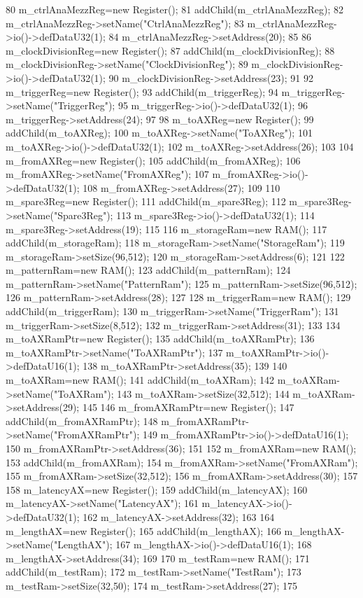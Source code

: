 \begin{DoxyCode}
{80     m_ctrlAnaMezzReg=new Register();
81     addChild(m_ctrlAnaMezzReg);
82     m_ctrlAnaMezzReg->setName("CtrlAnaMezzReg");
83     m_ctrlAnaMezzReg->io()->defDataU32(1);
84     m_ctrlAnaMezzReg->setAddress(20);
85 
86     m_clockDivisionReg=new Register();
87     addChild(m_clockDivisionReg);
88     m_clockDivisionReg->setName("ClockDivisionReg");
89     m_clockDivisionReg->io()->defDataU32(1);
90     m_clockDivisionReg->setAddress(23);
91 
92     m_triggerReg=new Register();
93     addChild(m_triggerReg);
94     m_triggerReg->setName("TriggerReg");
95     m_triggerReg->io()->defDataU32(1);
96     m_triggerReg->setAddress(24);
97 
98     m_toAXReg=new Register();
99     addChild(m_toAXReg);
100     m_toAXReg->setName("ToAXReg");
101     m_toAXReg->io()->defDataU32(1);
102     m_toAXReg->setAddress(26);
103 
104     m_fromAXReg=new Register();
105     addChild(m_fromAXReg);
106     m_fromAXReg->setName("FromAXReg");
107     m_fromAXReg->io()->defDataU32(1);
108     m_fromAXReg->setAddress(27);
109 
110     m_spare3Reg=new Register();
111     addChild(m_spare3Reg);
112     m_spare3Reg->setName("Spare3Reg");
113     m_spare3Reg->io()->defDataU32(1);
114     m_spare3Reg->setAddress(19);
115 
116     m_storageRam=new RAM();
117     addChild(m_storageRam);
118     m_storageRam->setName("StorageRam");
119     m_storageRam->setSize(96,512);
120     m_storageRam->setAddress(6);
121 
122     m_patternRam=new RAM();
123     addChild(m_patternRam);
124     m_patternRam->setName("PatternRam");
125     m_patternRam->setSize(96,512);
126     m_patternRam->setAddress(28);
127 
128     m_triggerRam=new RAM();
129     addChild(m_triggerRam);
130     m_triggerRam->setName("TriggerRam");
131     m_triggerRam->setSize(8,512);
132     m_triggerRam->setAddress(31);
133 
134     m_toAXRamPtr=new Register();
135     addChild(m_toAXRamPtr);
136     m_toAXRamPtr->setName("ToAXRamPtr");
137     m_toAXRamPtr->io()->defDataU16(1);
138     m_toAXRamPtr->setAddress(35);
139 
140     m_toAXRam=new RAM();
141     addChild(m_toAXRam);
142     m_toAXRam->setName("ToAXRam");
143     m_toAXRam->setSize(32,512);
144     m_toAXRam->setAddress(29);
145 
146     m_fromAXRamPtr=new Register();
147     addChild(m_fromAXRamPtr);
148     m_fromAXRamPtr->setName("FromAXRamPtr");
149     m_fromAXRamPtr->io()->defDataU16(1);
150     m_fromAXRamPtr->setAddress(36);
151 
152     m_fromAXRam=new RAM();
153     addChild(m_fromAXRam);
154     m_fromAXRam->setName("FromAXRam");
155     m_fromAXRam->setSize(32,512);
156     m_fromAXRam->setAddress(30);
157 
158     m_latencyAX=new Register();
159     addChild(m_latencyAX);
160     m_latencyAX->setName("LatencyAX");
161     m_latencyAX->io()->defDataU32(1);
162     m_latencyAX->setAddress(32);
163 
164     m_lengthAX=new Register();
165     addChild(m_lengthAX);
166     m_lengthAX->setName("LengthAX");
167     m_lengthAX->io()->defDataU16(1);
168     m_lengthAX->setAddress(34);
169 
170     m_testRam=new RAM();
171     addChild(m_testRam);
172     m_testRam->setName("TestRam");
173     m_testRam->setSize(32,50);
174     m_testRam->setAddress(27);
175   }
\end{DoxyCode}
